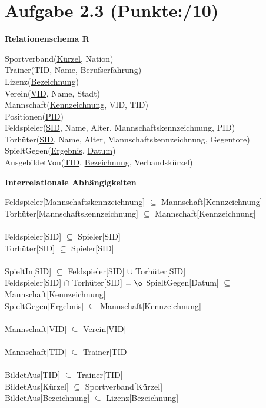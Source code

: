 \documentclass[11pt, a4paper]{article}
\newcommand{\blattnummer}{2}
\newcommand{\ppp}{10}
\newcommand{\aufgabe}[2] {\section*{Aufgabe \blattnummer.#1 (Punkte:\qquad/#2)}}
\begin{document}
\aufgabe{3}{\ppp}
\textbf{Relationenschema R}
\begin{adjustwidth}{20pt}{20pt}
Sportverband(\underline{Kürzel}, Nation)\\
Trainer(\underline{TID}, Name, Berufserfahrung)\\
Lizenz(\underline{Bezeichnung})\\
Verein(\underline{VID}, Name, Stadt)\\
Mannschaft(\underline{Kennzeichnung}, VID, TID)\\
Positionen(\underline{PID})\\
Feldspieler(\underline{SID}, Name, Alter, Mannschaftskennzeichnung, PID)\\
Torhüter(\underline{SID}, Name, Alter, Mannschaftskennzeichnung, Gegentore)\\
SpieltGegen(\underline{Ergebnis}, \underline{Datum})\\
AusgebildetVon(\underline{TID}, \underline{Bezeichnung}, Verbandskürzel)\\
\end{adjustwidth}

\textbf{Interrelationale Abhängigkeiten}
\begin{adjustwidth}{20pt}{20pt}
Feldspieler[Mannschaftskennzeichnung] $\subseteq$ Mannschaft[Kennzeichnung]\\
Torhüter[Mannschaftskennzeichnung] $\subseteq$ Mannschaft[Kennzeichnung]\\
\ \\
Feldspieler[SID] $\subseteq$ Spieler[SID]\\
Torhüter[SID] $\subseteq$ Spieler[SID]\\
\ \\
SpieltIn[SID] $\subseteq$ Feldspieler[SID] $\cup$ Torhüter[SID]\\
Feldspieler[SID] $\cap$ Torhüter[SID] $= \o$
SpieltGegen[Datum] $\subseteq$ Mannschaft[Kennzeichnung]\\
SpieltGegen[Ergebnis] $\subseteq$ Mannschaft[Kennzeichnung]\\
\ \\
Mannschaft[VID] $\subseteq$ Verein[VID]\\
\ \\
Mannschaft[TID] $\subseteq$ Trainer[TID]\\
\ \\
BildetAus[TID] $\subseteq$ Trainer[TID]\\
BildetAus[Kürzel] $\subseteq$ Sportverband[Kürzel]\\
BildetAus[Bezeichnung] $\subseteq$ Lizenz[Bezeichnung]\\
\end{adjustwidth}
\end{document}
